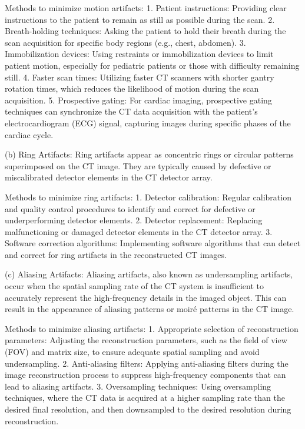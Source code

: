 \documentclass{assignment}
\begin{document}
\begin{problem}
{Methods to minimize motion artifacts:
1. Patient instructions: Providing clear instructions to the patient to remain as still as possible during the scan.
2. Breath-holding techniques: Asking the patient to hold their breath during the scan acquisition for specific body regions (e.g., chest, abdomen).
3. Immobilization devices: Using restraints or immobilization devices to limit patient motion, especially for pediatric patients or those with difficulty remaining still.
4. Faster scan times: Utilizing faster CT scanners with shorter gantry rotation times, which reduces the likelihood of motion during the scan acquisition.
5. Prospective gating: For cardiac imaging, prospective gating techniques can synchronize the CT data acquisition with the patient's electrocardiogram (ECG) signal, capturing images during specific phases of the cardiac cycle.

(b) Ring Artifacts:
Ring artifacts appear as concentric rings or circular patterns superimposed on the CT image. They are typically caused by defective or miscalibrated detector elements in the CT detector array.

Methods to minimize ring artifacts:
1. Detector calibration: Regular calibration and quality control procedures to identify and correct for defective or underperforming detector elements.
2. Detector replacement: Replacing malfunctioning or damaged detector elements in the CT detector array.
3. Software correction algorithms: Implementing software algorithms that can detect and correct for ring artifacts in the reconstructed CT images.

(c) Aliasing Artifacts:
Aliasing artifacts, also known as undersampling artifacts, occur when the spatial sampling rate of the CT system is insufficient to accurately represent the high-frequency details in the imaged object. This can result in the appearance of aliasing patterns or moiré patterns in the CT image.

Methods to minimize aliasing artifacts:
1. Appropriate selection of reconstruction parameters: Adjusting the reconstruction parameters, such as the field of view (FOV) and matrix size, to ensure adequate spatial sampling and avoid undersampling.
2. Anti-aliasing filters: Applying anti-aliasing filters during the image reconstruction process to suppress high-frequency components that can lead to aliasing artifacts.
3. Oversampling techniques: Using oversampling techniques, where the CT data is acquired at a higher sampling rate than the desired final resolution, and then downsampled to the desired resolution during reconstruction.
}
\newpage

\end{problem}
\end{document}
